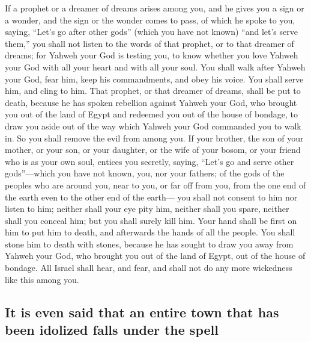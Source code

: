  If a prophet or a dreamer of dreams arises among you, and
he gives you a sign or a wonder,  and the sign or the
wonder comes to pass, of which he spoke to you, saying, ``Let's go after
other gods'' (which you have not known) ``and let's serve them,''
 you shall not listen to the words of that prophet, or to
that dreamer of dreams; for Yahweh your God is testing you, to know
whether you love Yahweh your God with all your heart and with all your
soul.  You shall walk after Yahweh your God, fear him,
keep his commandments, and obey his voice. You shall serve him, and
cling to him.  That prophet, or that dreamer of dreams,
shall be put to death, because he has spoken rebellion against Yahweh
your God, who brought you out of the land of Egypt and redeemed you out
of the house of bondage, to draw you aside out of the way which Yahweh
your God commanded you to walk in. So you shall remove the evil from
among you.  If your brother, the son of your mother, or
your son, or your daughter, or the wife of your bosom, or your friend
who is as your own soul, entices you secretly, saying, ``Let's go and
serve other gods''---which you have not known, you, nor your fathers;
 of the gods of the peoples who are around you, near to
you, or far off from you, from the one end of the earth even to the
other end of the earth---  you shall not consent to him
nor listen to him; neither shall your eye pity him, neither shall you
spare, neither shall you conceal him;  but you shall
surely kill him. Your hand shall be first on him to put him to death,
and afterwards the hands of all the people.  You shall
stone him to death with stones, because he has sought to draw you away
from Yahweh your God, who brought you out of the land of Egypt, out of
the house of bondage.  All Israel shall hear, and fear,
and shall not do any more wickedness like this among you.

\hypertarget{it-is-even-said-that-an-entire-town-that-has-been-idolized-falls-under-the-spell}{%
\subsection{It is even said that an entire town that has been idolized
falls under the
spell}\label{it-is-even-said-that-an-entire-town-that-has-been-idolized-falls-under-the-spell}}


